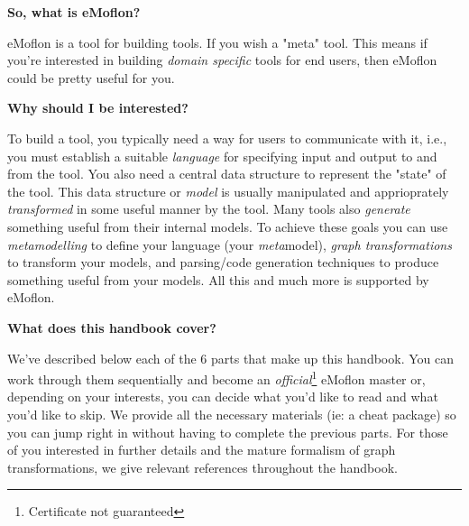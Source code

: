 {\bf \large So, what is eMoflon?}

eMoflon is a tool for building tools.  If you wish a "meta" tool.  This means if you're interested in building \emph{domain specific} tools for end users, then eMoflon could be pretty useful for you.


{\bf \large Why should I be interested?}

To build a tool, you typically need a way for users to communicate with it, i.e., you must establish a suitable \emph{language} for specifying input and output to and from the tool.  You also need a central data structure to represent the "state" of the tool.  This data structure or \emph{model} is usually manipulated and apprioprately \emph{transformed} in some useful manner by the tool.  Many tools also \emph{generate} something useful from their internal models.  To achieve these goals you can use \emph{metamodelling} to define your language (your \emph{meta}model), \emph{graph transformations} to transform your models, and parsing/code generation techniques to produce something useful from your models. All this and much more is supported by eMoflon.


{\bf \large What does this handbook cover?}

We've described below each of the 6 parts that make up this handbook. You can work through them sequentially and become an \emph{official}\footnote{Certificate not guaranteed} eMoflon master or, depending on your interests, you can decide what you'd like to read and what you'd like to skip. We provide all the necessary materials (ie: a cheat package) so you can jump right in without having to complete the previous parts. For those of you interested in further details and the mature formalism of graph transformations, we give relevant references throughout the handbook.

